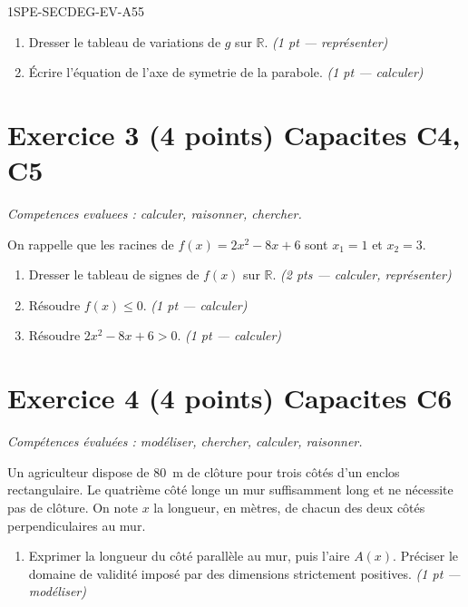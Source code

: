 \begin{evaluation}{1SPE-SECDEG-EV-A}{55}
\begin{enumerate}
  \item Dresser le tableau de variations de $g$ sur $\mathbb{R}$.
  \hfill\textit{(1 pt — représenter)}

  \item Écrire l'équation de l'axe de symetrie de la parabole.
  \hfill\textit{(1 pt — calculer)}
\end{enumerate}

\section*{Exercice 3 \hfill (4 points) \hfill Capacites C4, C5}

\textit{Competences evaluees : calculer, raisonner, chercher.}

\medskip
On rappelle que les racines de $f(x) = 2x^2 - 8x + 6$ sont $x_1 = 1$ et $x_2 = 3$.

\begin{enumerate}
  \item Dresser le tableau de signes de $f(x)$ sur $\mathbb{R}$.
  \hfill\textit{(2 pts — calculer, représenter)}

  \item Résoudre $f(x) \leq 0$.
  \hfill\textit{(1 pt — calculer)}

  \item Résoudre $2x^2 - 8x + 6 > 0$.
  \hfill\textit{(1 pt — calculer)}
\end{enumerate}

\section*{Exercice 4 \hfill (4 points) \hfill Capacites C6}

\textit{Compétences évaluées : modéliser, chercher, calculer, raisonner.}

\medskip
Un agriculteur dispose de $80$~m de clôture pour trois côtés d'un enclos
rectangulaire. Le quatrième côté longe un mur suffisamment long et ne
nécessite pas de clôture. On note $x$ la longueur, en mètres, de chacun des
deux côtés perpendiculaires au mur.

\begin{enumerate}
  \item Exprimer la longueur du côté parallèle au mur, puis l'aire $A(x)$.
  Préciser le domaine de validité imposé par des dimensions strictement positives.
  \hfill\textit{(1 pt — modéliser)}


\end{enumerate}
\end{evaluation}
